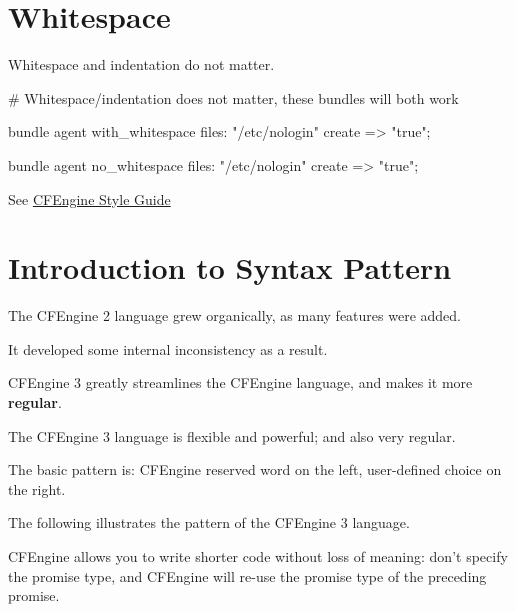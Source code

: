 \section{Whitespace}

Whitespace and indentation do not matter.

\begin{codelisting}
\begin{code}
# Whitespace/indentation does not matter, these bundles will both work

bundle agent with_whitespace
{
  files:
      "/etc/nologin"
        create => "true";
}

bundle agent no_whitespace { files: "/etc/nologin" create => "true"; }
\end{code}
\end{codelisting}





See \href{https://docs.cfengine.com/latest/guide-writing-and-serving-policy-policy-style.html}{CFEngine Style
Guide}





\section{Introduction to Syntax Pattern}

The CFEngine 2 language grew organically, as many features were added.

It developed some internal inconsistency as a result.

CFEngine 3 greatly streamlines the CFEngine language, and makes it more \textbf{regular}.

The CFEngine 3 language is flexible and powerful; and also very regular.

The basic pattern is: CFEngine reserved word on the left, user-defined choice on the right.

The following illustrates the pattern of the CFEngine 3 language.






CFEngine allows you to write shorter code without loss of meaning:
don't specify the promise type, and CFEngine will re-use the promise
type of the preceding promise.

